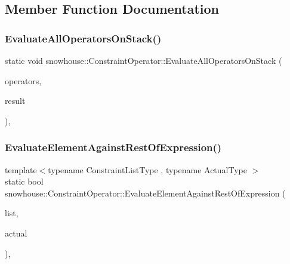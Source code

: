 \subsection{Member Function Documentation}
\mbox{\label{structsnowhouse_1_1ConstraintOperator_abccac090f8d0b6e400934dbb24e6d4e4}} 
\subsubsection{\texorpdfstring{EvaluateAllOperatorsOnStack()}{EvaluateAllOperatorsOnStack()}}
{\footnotesize\ttfamily static void snowhouse\+::\+Constraint\+Operator\+::\+Evaluate\+All\+Operators\+On\+Stack (\begin{DoxyParamCaption}\item[{\mbox{\hyperlink{namespacesnowhouse_adcb10e215e6a4bbcb35722a9c7270fc6}{Operator\+Stack}} \&}]{operators,  }\item[{\mbox{\hyperlink{namespacesnowhouse_a719169b1315a13161c15f25e600a8f51}{Result\+Stack}} \&}]{result }\end{DoxyParamCaption})\hspace{0.3cm}{\ttfamily [inline]}, {\ttfamily [static]}}

\mbox{\label{structsnowhouse_1_1ConstraintOperator_afbfbb1f5a56cd105ffbe8caceaaa7930}} 
\subsubsection{\texorpdfstring{EvaluateElementAgainstRestOfExpression()}{EvaluateElementAgainstRestOfExpression()}}
{\footnotesize\ttfamily template$<$typename Constraint\+List\+Type , typename Actual\+Type $>$ \\
static bool snowhouse\+::\+Constraint\+Operator\+::\+Evaluate\+Element\+Against\+Rest\+Of\+Expression (\begin{DoxyParamCaption}\item[{Constraint\+List\+Type \&}]{list,  }\item[{const Actual\+Type \&}]{actual }\end{DoxyParamCaption})\hspace{0.3cm}{\ttfamily [inline]}, {\ttfamily [static]}}

